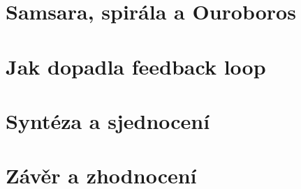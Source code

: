 \documentclass[11pt,a4paper]{article}
\begin{document}
\section{Samsara, spirála a Ouroboros}




\section{Jak dopadla feedback loop}




\section{Syntéza a sjednocení}




\section{Závěr a zhodnocení}


\newpage
\printbibliography[heading=bibintoc, title={Bibliografie}]
\end{document}
